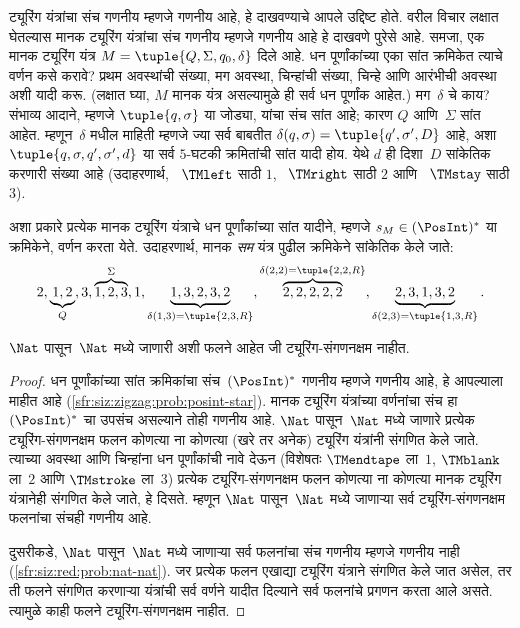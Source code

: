 \begin{explain}
ट्यूरिंग यंत्रांचा संच गणनीय म्हणजे गणनीय
आहे, हे दाखवण्याचे आपले उद्दिष्ट होते. वरील विचार
लक्षात घेतल्यास मानक ट्यूरिंग यंत्रांचा संच
गणनीय म्हणजे गणनीय
आहे हे दाखवणे पुरेसे आहे. समजा, एक मानक ट्यूरिंग
यंत्र $M = \tuple{Q, \Sigma, q_0, \delta}$ दिले
आहे. धन पूर्णांकांच्या एका सांत क्रमिकेत त्याचे
वर्णन कसे करावे? प्रथम अवस्थांची संख्या, मग
अवस्था, चिन्हांची संख्या, चिन्हे आणि आरंभीची
अवस्था अशी यादी करू. (लक्षात घ्या, $M$ मानक
यंत्र असल्यामुळे ही सर्व धन पूर्णांक आहेत.)
मग~$\delta$ चे काय? संभाव्य आदाने, म्हणजे
$\tuple{q,\sigma}$ या जोड्या, यांचा संच सांत आहे;
कारण $Q$ आणि~$\Sigma$ सांत आहेत. म्हणून~$\delta$
मधील माहिती म्हणजे ज्या सर्व बाबतीत
$\delta(q,\sigma) = \tuple{q', \sigma', D}$ आहे,
अशा $\tuple{q, \sigma, q', \sigma', d}$
या सर्व $5$-घटकी क्रमितांची सांत यादी होय.
येथे $d$ ही दिशा~$D$ सांकेतिक
करणारी संख्या आहे (उदाहरणार्थ,
~$\TMleft$ साठी $1$, ~$\TMright$ साठी $2$
आणि ~$\TMstay$ साठी $3$).

अशा प्रकारे प्रत्येक मानक ट्यूरिंग यंत्राचे
धन पूर्णांकांच्या सांत यादीने, म्हणजे
$s_M \in (\PosInt)^*$ या क्रमिकेने, वर्णन
करता येते. उदाहरणार्थ, मानक \emph{सम}
यंत्र पुढील क्रमिकेने सांकेतिक केले जाते:
\[2, \underbrace{1, 2}_Q, 3, \overbrace{1, 2, 3}^\Sigma, 1, \underbrace{1, 3, 2, 3, 2}_{\delta(1,3) = \tuple{2,3,R}},
\overbrace{2, 2, 2, 2, 2}^{\delta(2,2) = \tuple{2,2,R}},
\underbrace{2, 3, 1, 3, 2}_{\delta(2,3) = \tuple{1,3,R}}.
\]
\end{explain}

\begin{thm}
$\Nat$ पासून~$\Nat$ मध्ये जाणारी अशी फलने
आहेत जी ट्यूरिंग-संगणनक्षम नाहीत.
\end{thm}

\begin{proof}
धन पूर्णांकांच्या सांत क्रमिकांचा संच~$(\PosInt)^*$
गणनीय म्हणजे गणनीय आहे, हे आपल्याला माहीत आहे
(\ref{sfr:siz:zigzag:prob:posint-star}). मानक ट्यूरिंग
यंत्रांच्या वर्णनांचा संच हा~$(\PosInt)^*$ चा उपसंच
असल्याने तोही गणनीय आहे. $\Nat$ पासून~$\Nat$
मध्ये जाणारे प्रत्येक ट्यूरिंग-संगणनक्षम फलन कोणत्या
ना कोणत्या (खरे तर अनेक) ट्यूरिंग यंत्रांनी संगणित
केले जाते. त्याच्या अवस्था आणि चिन्हांना धन
पूर्णांकांची नावे देऊन (विशेषतः $\TMendtape$ ला~$1$,
$\TMblank$ ला~$2$ आणि $\TMstroke$ ला~$3$)
प्रत्येक ट्यूरिंग-संगणनक्षम फलन कोणत्या ना कोणत्या
मानक ट्यूरिंग यंत्रानेही संगणित केले जाते, हे
दिसते. म्हणून $\Nat$ पासून~$\Nat$ मध्ये जाणाऱ्या
सर्व ट्यूरिंग-संगणनक्षम फलनांचा संचही गणनीय आहे.

दुसरीकडे, $\Nat$ पासून~$\Nat$ मध्ये जाणाऱ्या
सर्व फलनांचा संच गणनीय म्हणजे गणनीय नाही
(\ref{sfr:siz:red:prob:nat-nat}). जर प्रत्येक
फलन एखाद्या ट्यूरिंग यंत्राने संगणित केले
जात असेल, तर ती फलने संगणित करणाऱ्या यंत्रांची
सर्व वर्णने यादीत दिल्याने सर्व फलनांचे प्रगणन
करता आले असते. त्यामुळे काही फलने
ट्यूरिंग-संगणनक्षम नाहीत.
\end{proof}

